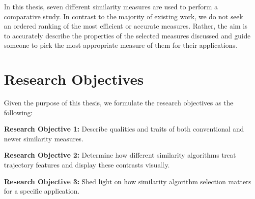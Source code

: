 In this thesis, seven different similarity measures are used to perform a comparative study. 
In contrast to the majority of existing work, we do not seek an ordered ranking of the most efficient or accurate measures. 
Rather, the aim is to accurately describe the properties of the selected measures discussed and guide someone to pick the most appropriate measure of them for their applications. 







\clearpage
\section{Research Objectives} \label{1_ro}
Given the purpose of this thesis, we formulate the research objectives as the following:   



\textbf{Research Objective 1: }
Describe qualities and traits of both conventional and newer similarity measures.

\textbf{Research Objective 2: }
Determine how different similarity algorithms treat trajectory features and display these contrasts visually.

\textbf{Research Objective 3: }
Shed light on how similarity algorithm selection matters for a specific application.








